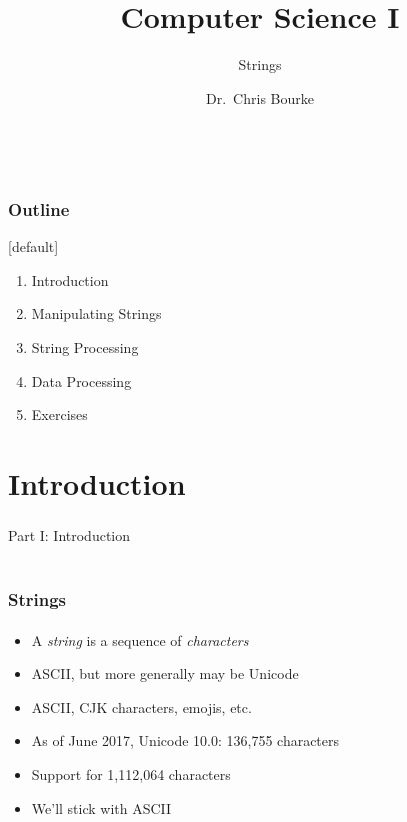 \documentclass[]{beamer}
\title[~]{Computer Science I}
\subtitle{Strings}
\author[~]{Dr.\ Chris Bourke\\ \email{cbourke@cse.unl.edu}} %
\date{~}
\begin{document}
\begin{frame}
  \titlepage
\end{frame}


\begin{frame}
  \frametitle{Outline}

[default]
\begin{enumerate}
  \item Introduction 
  \item Manipulating Strings
  \item String Processing
  \item Data Processing
  \item Exercises
\end{enumerate}

\end{frame}

\section{Introduction}

\begin{frame}
    \frametitle{}
    \framesubtitle{}
    
    \begin{center}
    {\Huge Part I: Introduction}\\
    {\Large ~}
    \end{center}

\end{frame}

\begin{frame}[fragile]
    \frametitle{Strings}
    \framesubtitle{}

\begin{itemize}[<+->]
  \item A \emph{string} is a sequence of \emph{characters}
  \item ASCII, but more generally may be Unicode
  \item ASCII, CJK characters, emojis, etc.
  \item As of June 2017, Unicode 10.0: 136,755 characters
  \item Support for 1,112,064 characters
  \item We'll stick with ASCII
\end{itemize}

\end{frame}
\end{document}

